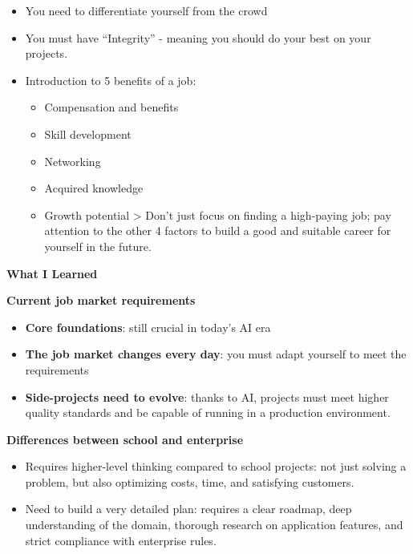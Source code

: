 \begin{itemize}
\tightlist
\item
  You need to differentiate yourself from the crowd
\item
  You must have ``Integrity'' - meaning you should do your best on your
  projects.
\item
  Introduction to 5 benefits of a job:

  \begin{itemize}
  \tightlist
  \item
    Compensation and benefits
  \item
    Skill development
  \item
    Networking
  \item
    Acquired knowledge
  \item
    Growth potential \textgreater{} Don't just focus on finding a
    high-paying job; pay attention to the other 4 factors to build a
    good and suitable career for yourself in the future.
  \end{itemize}
\end{itemize}

\vspace{0.5em}\noindent\textbf{What I Learned}\par

\vspace{0.5em}\noindent\textbf{Current job market
requirements}\par

\begin{itemize}
\tightlist
\item
  \textbf{Core foundations}: still crucial in today's AI era
\item
  \textbf{The job market changes every day}: you must adapt yourself to
  meet the requirements
\item
  \textbf{Side-projects need to evolve}: thanks to AI, projects must
  meet higher quality standards and be capable of running in a
  production environment.
\end{itemize}

\vspace{0.5em}\noindent\textbf{Differences between school and
enterprise}\par

\begin{itemize}
\tightlist
\item
  Requires higher-level thinking compared to school projects: not just
  solving a problem, but also optimizing costs, time, and satisfying
  customers.
\item
  Need to build a very detailed plan: requires a clear roadmap, deep
  understanding of the domain, thorough research on application
  features, and strict compliance with enterprise rules.
\end{itemize}

